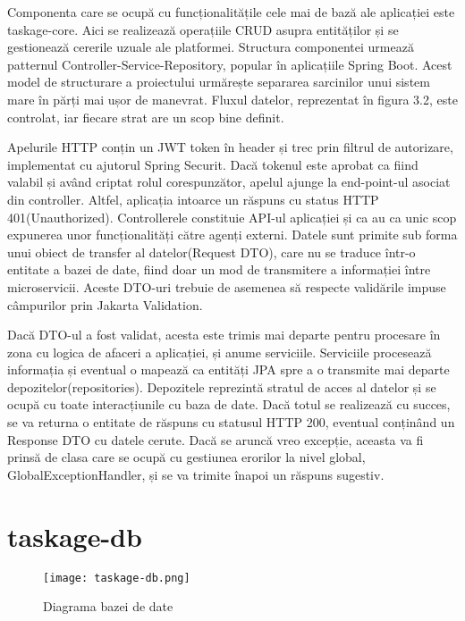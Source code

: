 Componenta care se ocupă cu funcționalitățile cele mai de bază ale aplicației este taskage-core. Aici se realizează operațiile CRUD asupra entităților și se gestionează cererile uzuale ale platformei. Structura componentei urmează patternul Controller-Service-Repository, popular în aplicațiile Spring Boot. Acest model de structurare a proiectului urmărește separarea sarcinilor unui sistem mare în părți mai ușor de manevrat. Fluxul datelor, reprezentat în figura 3.2, este controlat, iar fiecare strat are un scop bine definit. 

Apelurile HTTP conțin un JWT token în header și trec prin filtrul de autorizare, implementat cu ajutorul Spring Securit. Dacă tokenul este aprobat ca fiind valabil și având criptat rolul corespunzător, apelul ajunge la end-point-ul asociat din controller. Altfel, aplicația intoarce un răspuns cu status HTTP 401(Unauthorized). Controllerele constituie API-ul aplicației și ca au ca unic scop expunerea unor funcționalități către agenți externi. Datele sunt primite sub forma unui obiect de transfer al datelor(Request DTO), care nu se traduce într-o entitate a bazei de date, fiind doar un mod de transmitere a informației între microservicii. Aceste DTO-uri trebuie de asemenea să respecte validările impuse câmpurilor prin Jakarta Validation.

Dacă DTO-ul a fost validat, acesta este trimis mai departe pentru procesare în zona cu logica de afaceri a aplicației, și anume serviciile. Serviciile procesează informația și eventual o mapează ca entități JPA spre a o transmite mai departe depozitelor(repositories). Depozitele reprezintă stratul de acces al datelor și se ocupă cu toate interacțiunile cu baza de date. Dacă totul se realizează cu succes, se va returna o entitate de răspuns cu statusul HTTP 200, eventual conținând un Response DTO cu datele cerute. Dacă se aruncă vreo excepție, aceasta va fi prinsă de clasa care se ocupă cu gestiunea erorilor la nivel global, GlobalExceptionHandler, și se va trimite înapoi un răspuns sugestiv.

\section{taskage-db}

 \begin{figure}[ht]
	\centering
 	 \texttt{[image: taskage-db.png]}
	\caption{Diagrama bazei de date}
	\label{taskage-db}
 \end{figure}

